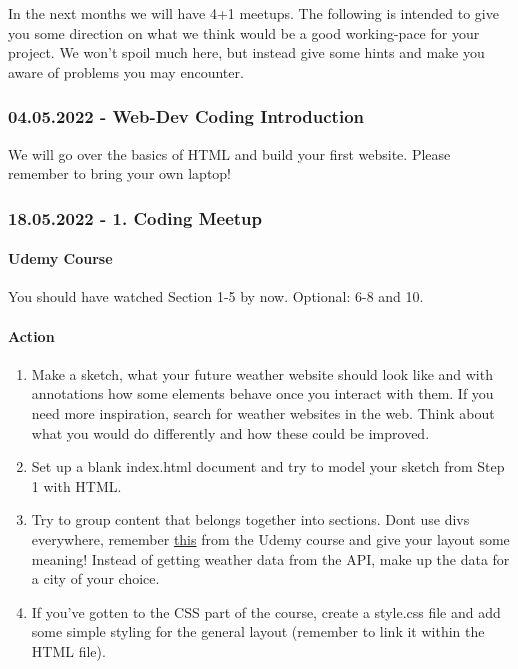 \documentclass[
]{article}
\providecommand{\tightlist}{%
  \setlength{\itemsep}{0pt}\setlength{\parskip}{0pt}}
\begin{document}
In the next months we will have 4+1 meetups. The following is intended to give you some direction on what we think would be a good working-pace for your project. We won't spoil much here, but instead give some hints and make you aware of problems you may encounter.

\hypertarget{web-dev-coding-introduction}{%
\subsubsection*{04.05.2022 - Web-Dev Coding Introduction}\label{web-dev-coding-introduction}}

We will go over the basics of HTML and build your first website. Please remember to bring your own laptop!

\hypertarget{coding-meetup}{%
\subsubsection*{18.05.2022 - 1. Coding Meetup}\label{coding-meetup}}

\hypertarget{udemy-course}{%
\paragraph{Udemy Course}\label{udemy-course}}

You should have watched Section 1-5 by now. Optional: 6-8 and 10.

\hypertarget{action}{%
\paragraph{Action}\label{action}}

\begin{enumerate}
\def\labelenumi{\arabic{enumi}.}
\tightlist
\item
  Make a sketch, what your future weather website should look like and with annotations how some elements behave once you interact with them. If you need more inspiration, search for weather websites in the web. Think about what you would do differently and how these could be improved.\\
\item
  Set up a blank index.html document and try to model your sketch from Step 1 with HTML.
\item
  Try to group content that belongs together into sections. Dont use divs everywhere, remember \href{https://www.udemy.com/course/the-web-developer-bootcamp/learn/lecture/21919368\#overview}{this} from the Udemy course and give your layout some meaning! Instead of getting weather data from the API, make up the data for a city of your choice.
\item
  If you've gotten to the CSS part of the course, create a style.css file and add some simple styling for the general layout (remember to link it within the HTML file).
\end{enumerate}
\end{document}
